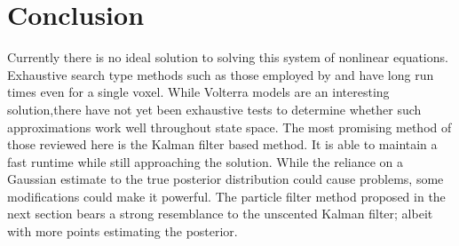 \section{Conclusion}
Currently there is no ideal solution to solving this system of nonlinear
equations. Exhaustive search type methods such as those employed by
\cite{Johnston2008} and \cite{Vakorin2007} have long
run times even for a single voxel. While Volterra models are an interesting
solution,there have not yet been exhaustive tests to determine whether
such approximations work well throughout state space. The most promising
method of those reviewed here is the Kalman filter based method. It is
able to maintain a fast runtime while still approaching the solution.
While the reliance on a Gaussian estimate to the true posterior distribution could
cause problems, some modifications could make it powerful. 
The particle filter method proposed in the next section bears a strong 
resemblance to the unscented Kalman filter; albeit with more points estimating
the posterior. 
